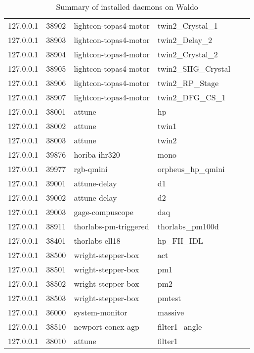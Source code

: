 \begin{table}[]
\begin{tabular}{llllll}
127.0.0.1 & 38902 & lightcon-topas4-motor   & twin2\_Crystal\_1  \\
127.0.0.1 & 38903 & lightcon-topas4-motor   & twin2\_Delay\_2    \\
127.0.0.1 & 38904 & lightcon-topas4-motor   & twin2\_Crystal\_2  \\
127.0.0.1 & 38905 & lightcon-topas4-motor   & twin2\_SHG\_Crystal \\
127.0.0.1 & 38906 & lightcon-topas4-motor   & twin2\_RP\_Stage   \\
127.0.0.1 & 38907 & lightcon-topas4-motor   & twin2\_DFG\_CS\_1  \\
127.0.0.1 & 38001 & attune                  & hp                 \\
127.0.0.1 & 38002 & attune                  & twin1              \\
127.0.0.1 & 38003 & attune                  & twin2              \\
127.0.0.1 & 39876 & horiba-ihr320           & mono               \\
127.0.0.1 & 39977 & rgb-qmini               & orpheus\_hp\_qmini \\
127.0.0.1 & 39001 & attune-delay            & d1                 \\
127.0.0.1 & 39002 & attune-delay            & d2                 \\
127.0.0.1 & 39003 & gage-compuscope         & daq                \\
127.0.0.1 & 38911 & thorlabs-pm-triggered   & thorlabs\_pm100d   \\
127.0.0.1 & 38401 & thorlabs-ell18          & hp\_FH\_IDL        \\
127.0.0.1 & 38500 & wright-stepper-box      & act                \\
127.0.0.1 & 38501 & wright-stepper-box      & pm1                \\
127.0.0.1 & 38502 & wright-stepper-box      & pm2                \\
127.0.0.1 & 38503 & wright-stepper-box      & pmtest             \\
127.0.0.1 & 36000 & system-monitor          & massive            \\
127.0.0.1 & 38510 & newport-conex-agp       & filter1\_angle     \\
127.0.0.1 & 38010 & attune                  & filter1            \\ \hline
\end{tabular}
\caption[Waldo Daemons]{Summary of installed daemons on Waldo}
\label{waldo:tab:summary}
\end{table}


\clearpage
